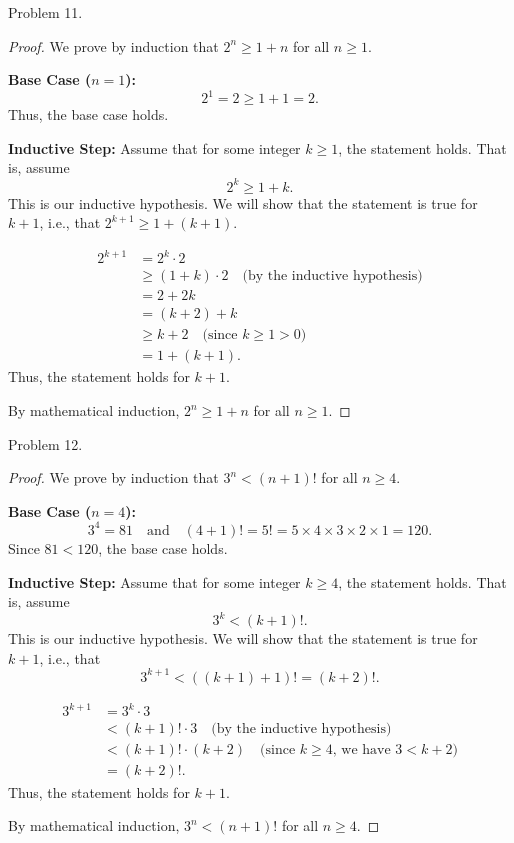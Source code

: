 \documentclass{article}
\begin{document}
Problem 11.
\begin{proof}
We prove by induction that $2^{n} \geq 1 + n$ for all $n \geq 1$.

\textbf{Base Case ($n = 1$):}
\[
2^{1} = 2 \geq 1 + 1 = 2.
\]
Thus, the base case holds.

\textbf{Inductive Step:} Assume that for some integer $k \geq 1$, the statement holds. That is, assume
\[
2^{k} \geq 1 + k.
\]
This is our inductive hypothesis. We will show that the statement is true for $k+1$, i.e., that $2^{k+1} \geq 1 + (k+1)$.

\begin{align*}
2^{k+1} &= 2^{k} \cdot 2 \\
&\geq (1 + k) \cdot 2 \quad \text{(by the inductive hypothesis)} \\
&= 2 + 2k \\
&= (k + 2) + k \\
&\geq k + 2 \quad \text{(since $k \geq 1 > 0$)} \\
&= 1 + (k + 1).
\end{align*}
Thus, the statement holds for $k+1$.

By mathematical induction, $2^{n} \geq 1 + n$ for all $n \geq 1$.
\end{proof}

Problem 12.
\begin{proof}
We prove by induction that $3^{n} < (n + 1)!$ for all $n \geq 4$.

\textbf{Base Case ($n = 4$):}
\[
3^{4} = 81 \quad \text{and} \quad (4 + 1)! = 5! = 5 \times 4 \times 3 \times 2 \times 1 = 120.
\]
Since $81 < 120$, the base case holds.

\textbf{Inductive Step:} Assume that for some integer $k \geq 4$, the statement holds. That is, assume
\[
3^{k} < (k + 1)!.
\]
This is our inductive hypothesis. We will show that the statement is true for $k + 1$, i.e., that 
\[
3^{k+1} < ((k + 1) + 1)! = (k + 2)!.
\]

\begin{align*}
3^{k+1} &= 3^{k} \cdot 3 \\
&< (k + 1)! \cdot 3 \quad \text{(by the inductive hypothesis)} \\
&< (k + 1)! \cdot (k + 2) \quad \text{(since $k \geq 4$, we have $3 < k + 2$)} \\
&= (k + 2)!.
\end{align*}
Thus, the statement holds for $k + 1$.

By mathematical induction, $3^{n} < (n + 1)!$ for all $n \geq 4$.
\end{proof}
\end{document}

